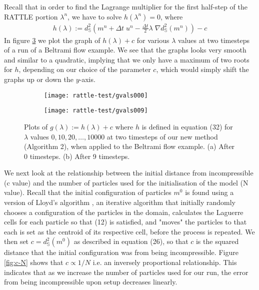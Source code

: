 \documentclass[11pt, oneside]{article}   	%
\newcommand{\dt}{\Delta t}
\newcommand{\Sb}{\mathbb{S}}
\begin{document}
Recall that in order to find the Lagrange multiplier for the first half-step of the RATTLE portion \(\lambda^n\), we have to solve \(h(\lambda^n) = 0\), where
\begin{align}
 h(\lambda) := d^{2}_{\Sb}(m^n + \dt \; u^n - \frac{\dt}{2} \lambda \; \nabla d^2_\Sb(m^n)) - c
\end{align}
In figure \ref{fig:g-lambda} we plot the graph of \(h(\lambda) + c\) for various \(\lambda\) values at two timesteps of a run of a Beltrami flow example. We see that the graphs looks very smooth and similar to a quadratic, implying that we only have a maximum of two roots for \(h\), depending on our choice of the parameter \(c\), which would simply shift the graphs up or down the \(y\)-axis.

\begin{figure}[H]
   \begin{subfigure}[t]{0.4\textwidth}
        \centering
	\texttt{[image: rattle-test/gvals000]}
        \caption{} \label{fig:g-lambda-000}
    \end{subfigure}
    \begin{subfigure}[t]{0.4\textwidth}
        \centering
	\texttt{[image: rattle-test/gvals009]}
        \caption{} \label{fig:g-lambda-009}
    \end{subfigure}
\centering
\caption{Plots of \(g(\lambda) := h(\lambda) + c\) where \(h\) is defined in equation (32) for \(\lambda\) values \(0, 10, 20, \dots,10000\) at two timesteps of our new method (Algorithm 2), when applied to the Beltrami flow example. (a) After 0 timesteps. (b) After 9 timesteps.}
\centering
\label{fig:g-lambda}
\end{figure}

We next look at the relationship between the initial distance from incompressible (c value) and the number of particles used for the initialisation of the model (N value). Recall that the initial configuration of particles \(m^0\) is found using a version of Lloyd's algorithm \citep{merigot2017algorithm}, an iterative algorithm that initially randomly chooses a configuration of the particles in the domain, calculates the Laguerre cells for each particle so that (12) is satisfied, and "moves" the particles to that each is set as the centroid of its respective cell, before the process is repeated. We then set \(c = d^{2}_{\mathbb{S}}(m^{0})\) as described in equation (26), so that \(c\) is the squared distance that the initial configuration was from being incompressible. Figure \ref{fig:c-N} shows that \(c \propto 1/N\) i.e. an inversely proportional relationship. This indicates that as we increase the number of particles used for our run, the error from being incompressible upon setup decreases linearly.
\end{document}
